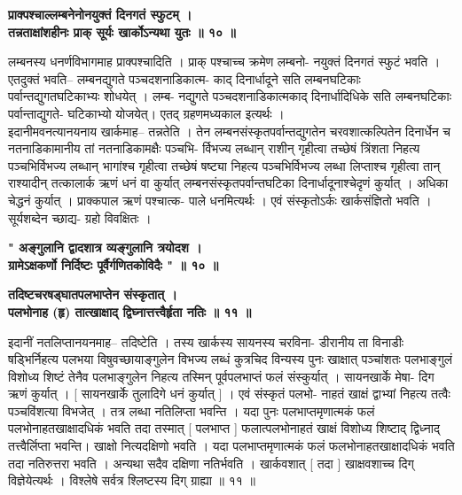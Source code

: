 \documentclass[11pt, openany]{book}
\begin{document}
{{{{\vspace{2mm}
\centering
\textbf{
\hspace{-2.3cm}
 प्राक्पश्चाल्लम्बनेनोनयुक्तं दिनगतं स्फुटम् ।\\
 तन्नताक्षांशहीनः प्राक् सूर्यः खार्कोऽन्यथा युतः ॥ १० ॥}

\vspace{2mm}
\justifying
 लम्बनस्य धनर्णविभागमाह प्राक्पश्चादिति । प्राक् पश्चाच्च क्रमेण
लम्बनो-
नयुक्तं दिनगतं स्फुटं भवति । एतदुक्तं भवति-- लम्बनद्युगते
पञ्चदशनाडिकात्म-
काद् दिनार्धादूने सति लम्बनघटिकाः पर्वान्तद्युगतघटिकाभ्यः शोधयेत् ।
लम्ब-
नद्युगते पञ्चदशनाडिकात्मकाद् दिनार्धादिधिके सति लम्बनघटिकाः
पर्वान्ताद्युगते-
घटिकाभ्यो योजयेत्। एतद् ग्रहणमध्यकाल इत्यर्थः ।\\
\justifying
 इदानीमवनत्यानयनाय खार्कमाह-- तन्नतेति । तेन
लम्बनसंस्कृतपर्वान्तद्युगतेन
चरवशात्कल्पितेन दिनार्धेन च नतनाडिकामानीय तां नतनाडिकामक्षैः पञ्चभि-
र्विभज्य लब्धान् राशीन् गृहीत्वा तच्छेषं त्रिंशता निहत्य पञ्चभिर्विभज्य
लब्धान्
भागांश्च गृहीत्वा तच्छेषं षष्ट्या निहत्य पञ्चभिर्विभज्य लब्धा लिप्ताश्च
गृहीत्वा
तान् राश्यादीन् तत्कालार्क ऋणं धनं वा कुर्यात्
लम्बनसंस्कृतपर्वान्तघटिका
दिनार्धादूनाश्चेदृणं कुर्यात् । अधिका चेद्धनं कुर्यात् । प्राक्कपाल
ऋणं पश्चात्क-
पाले धनमित्यर्थः । एवं संस्कृतोऽर्कः खार्कसंज्ञितो भवति ।
सूर्यशब्देन च्छाद्य-
ग्रहो विवक्षितः ।

\vspace{2mm}
\centering
\textbf{
\hspace{-2cm}
 " अङ्गुलानि द्वादशात्र व्यङ्गुलानि त्रयोदश ।\\
 ग्रामेऽक्षकर्णो निर्दिष्टः पूर्वैर्गणितकोविदैः " ॥ १० ॥}

\newpage
\thispagestyle{fancy}
\fancyhf{}
\lhead{[ग्रहणाधिकारः]}
\centering
\textbf{
\hspace{-0.8cm}
 तदिष्टचरषड्घातपलभाप्तेन संस्कृतात् ।\\
\hspace{2cm}
 पलभोनाह (हृ) तात्खाक्षाद् द्विघ्नात्तत्त्वैर्हृता नतिः ॥ ११ ॥}

\vspace{2mm}
\justifying
 इदानीं नतलिप्तानयनमाह-- तदिष्टेति । तस्य खार्कस्य सायनस्य
चरविना-
डीरानीय ता विनाडीः षड्भिर्निहत्य पलभया विषुवच्छायाङ्गुलेन विभज्य लब्धं
कुत्रचिद विन्यस्य पुनः खाक्षात् पञ्चांशतः पलभाङ्गुलं विशोध्य शिष्टं
तेनैव
पलभाङ्गुलेन निहत्य तस्मिन् पूर्वपलभाप्तं फलं संस्कुर्यात् ।
सायनखार्के मेषा-
दिग ऋणं कुर्यात् । [ सायनखार्के तुलादिगे धनं कुर्यात् ] । एवं
संस्कृतं पलभो-
नाहतं खाक्षं द्वाभ्यां निहत्य तत्वैः पञ्चविंशत्या विभजेत् । तत्र
लब्धा नतिलिप्ता
भवन्ति । यदा पुनः पलभाप्तमृणात्मकं फलं पलभोनाहतखाक्षादधिकं
भवति तदा तस्मात् [ पलभाप्त ] फलात्पलभोनाहतं खाक्षं विशोध्य
शिष्टाद्
द्विध्नाद् तत्त्वैर्लिप्ता भवन्ति। खाक्षो नित्यदक्षिणो भवति । यदा
पलभाप्तमृणात्मकं
फलं फलभोनाहतखाक्षादधिकं भवति तदा नतिरुत्तरा भवति । अन्यथा
सदैव दक्षिणा नतिर्भवति । खार्कवशात् [ तदा ] खाक्षवशाच्च दिग्
विज्ञेयेत्यर्थः ।
विश्लेषे सर्वत्र श्लिष्टस्य दिग् ग्राह्या ॥ ११ ॥

}}}}
\end{document}
